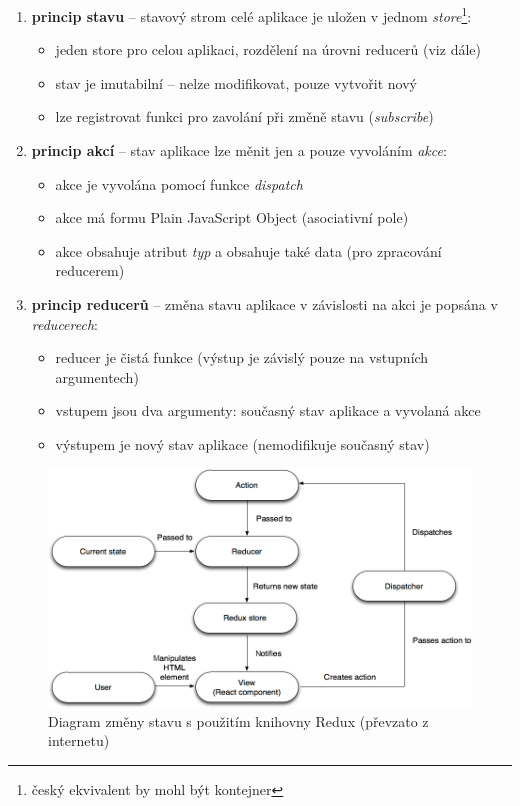 \begin{enumerate}
  \item \textbf{princip stavu} -- stavový strom celé aplikace je uložen v jednom \textit{store}\footnote{český ekvivalent by mohl být kontejner}:
    \begin{itemize}
      \item jeden store pro celou aplikaci, rozdělení na úrovni reducerů (viz dále)
      \item stav je imutabilní -- nelze modifikovat, pouze vytvořit nový
      \item lze registrovat funkci pro zavolání při změně stavu (\textit{subscribe})
    \end{itemize}
  \item \textbf{princip akcí} --  stav aplikace lze měnit jen a pouze vyvoláním \textit{akce}:
    \begin{itemize}
      \item akce je vyvolána pomocí funkce \textit{dispatch}
      \item akce má formu Plain JavaScript Object (asociativní pole)
      \item akce obsahuje atribut \textit{typ} a obsahuje také data (pro zpracování reducerem)
    \end{itemize}
  \item \textbf{princip reducerů} -- změna stavu aplikace v závislosti na akci je popsána v \textit{reducerech}:
    \begin{itemize}
      \item reducer je čistá funkce (výstup je závislý pouze na vstupních argumentech)
      \item vstupem jsou dva argumenty: současný stav aplikace a vyvolaná akce
      \item výstupem je nový stav aplikace (nemodifikuje současný stav)
    \end{itemize}
\end{enumerate}


\begin{figure}[!htb]
  \centering
  \includegraphics[width=14cm]{img/redux.png}
  \caption{Diagram změny stavu s použitím knihovny Redux (převzato z internetu)}
\end{figure}

